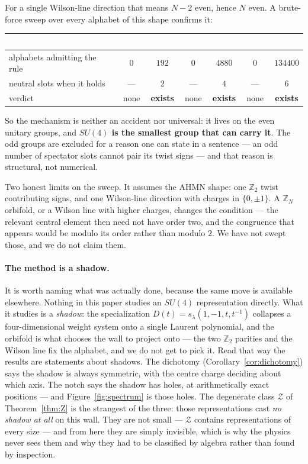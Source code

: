 \documentclass[11pt,a4paper]{article}
\newcommand{\ZZ}{\mathbb{Z}}
\begin{document}
For a single Wilson-line direction that means $N-2$ even, hence $N$ even. A brute-force sweep
over every alphabet of this shape confirms it:

\begin{center}\small
\begin{tabular}{lcccccc}
\toprule
\rowcolor{hdrblue}
\textcolor{white}{$SU(N)$} & \textcolor{white}{$N{=}3$} & \textcolor{white}{$N{=}4$} &
\textcolor{white}{$N{=}5$} & \textcolor{white}{$N{=}6$} & \textcolor{white}{$N{=}7$} &
\textcolor{white}{$N{=}8$}\\
\midrule
alphabets admitting the rule & $0$ & $192$ & $0$ & $4880$ & $0$ & $134400$\\
\rowcolor{softgrey}
neutral slots when it holds & --- & $2$ & --- & $4$ & --- & $6$\\
verdict & none & \textbf{exists} & none & \textbf{exists} & none & \textbf{exists}\\
\bottomrule
\end{tabular}
\end{center}

So the mechanism is neither an accident nor universal: it lives on the even unitary groups,
and \textbf{$SU(4)$ is the smallest group that can carry it}. The odd groups are excluded for
a reason one can state in a sentence --- an odd number of spectator slots cannot pair its
twist signs --- and that reason is structural, not numerical.

Two honest limits on the sweep. It assumes the AHMN shape: one $\ZZ_2$ twist contributing
signs, and one Wilson-line direction with charges in $\{0,\pm1\}$. A $\ZZ_N$ orbifold, or a
Wilson line with higher charges, changes the condition --- the relevant central element then
need not have order two, and the congruence that appears would be modulo its order rather
than modulo $2$. We have not swept those, and we do not claim them.

\paragraph{The method is a shadow.} It is worth naming what was actually done, because the
same move is available elsewhere. Nothing in this paper studies an $SU(4)$ representation
directly. What it studies is a \emph{shadow}: the specialization
$D(t)=s_\lambda(1,-1,t,t^{-1})$ collapses a four-dimensional weight system onto a single
Laurent polynomial, and the orbifold is what chooses the wall to project onto --- the two
$\ZZ_2$ parities and the Wilson line fix the alphabet, and we do not get to pick it. Read
that way the results are statements about shadows. The dichotomy
(Corollary~\ref{cor:dichotomy}) says the shadow is always symmetric, with the centre charge
deciding about which axis. The notch says the shadow has holes, at arithmetically exact
positions --- and Figure~\ref{fig:spectrum} is those holes. The degenerate class
$\mathcal Z$ of Theorem~\ref{thm:Z} is the strangest of the three: those representations cast
\emph{no shadow at all} on this wall. They are not small --- $\mathcal Z$ contains
representations of every size --- and from here they are simply invisible, which is why the
physics never sees them and why they had to be classified by algebra rather than found by
inspection.
\end{document}
